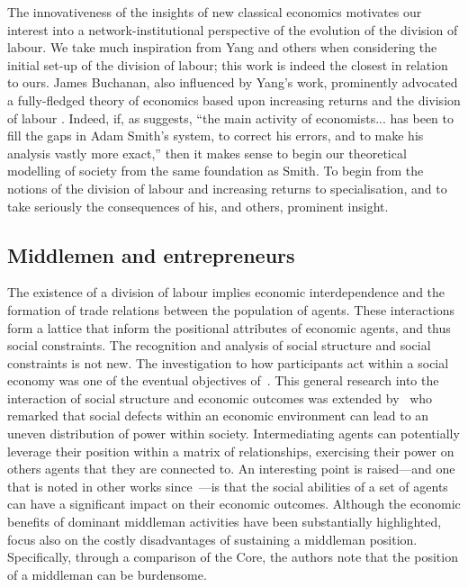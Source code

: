 \medskip \noindent The innovativeness of the insights of new classical economics motivates our interest into a network-institutional perspective of the evolution of the division of labour. We take much inspiration from Yang and others when considering the initial set-up of the division of labour; this work is indeed the closest in relation to ours. James Buchanan, also influenced by Yang's work, prominently advocated a fully-fledged theory of economics based upon increasing returns and the division of labour \citep{BuchananYoon1994}. Indeed, if, as \citet[p.~713]{Coase1992} suggests, ``the main activity of economists... has been to fill the gaps in Adam Smith's system, to correct his errors, and to make his analysis vastly more exact,'' then it makes sense to begin our theoretical modelling of society from the same foundation as Smith. To begin from the notions of the division of labour and increasing returns to specialisation, and to take seriously the consequences of his, and others, prominent insight.

\subsection{Middlemen and entrepreneurs}

The existence of a division of labour implies economic interdependence and the formation of trade relations between the population of agents. These interactions form a lattice that inform the positional attributes of economic agents, and thus social constraints. The recognition and analysis of social structure and social constraints is not new. The investigation to how participants act within a social economy was one of the eventual objectives of~\citet{vNM}. This general research into the interaction of social structure and economic outcomes was extended by~\citet{KalaiMiddlemen1978} who remarked that social defects within an economic environment can lead to an uneven distribution of power within society. Intermediating agents can potentially leverage their position within a matrix of relationships, exercising their power on others agents that they are connected to. An interesting point is raised---and one that is noted in other works since~\citet{Granovetter2005}---is that the social abilities of a set of agents can have a significant impact on their economic outcomes. Although the economic benefits of dominant middleman activities have been substantially highlighted,~\citet{KalaiMiddlemen1978} focus also on the costly disadvantages of sustaining a middleman position. Specifically, through a comparison of the Core, the authors note that the position of a middleman can be burdensome.

